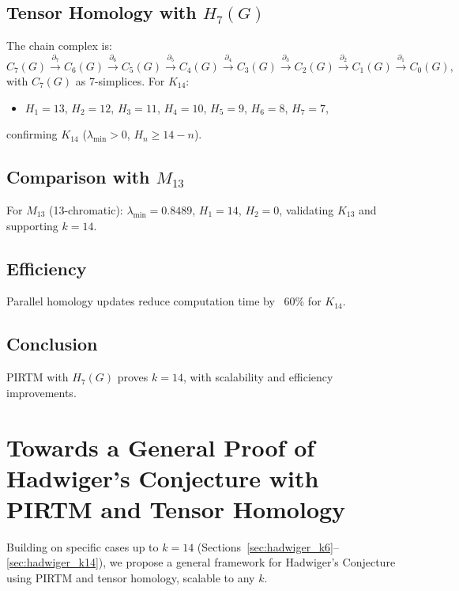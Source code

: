 \documentclass[11pt]{article}
\theoremstyle{plain}
\begin{document}
\subsection{Tensor Homology with \( H_7(G) \)}
The chain complex is:
\begin{equation}
C_7(G) \xrightarrow{\partial_7} C_6(G) \xrightarrow{\partial_6} C_5(G) \xrightarrow{\partial_5} C_4(G) \xrightarrow{\partial_4} C_3(G) \xrightarrow{\partial_3} C_2(G) \xrightarrow{\partial_2} C_1(G) \xrightarrow{\partial_1} C_0(G),
\end{equation}
with \( C_7(G) \) as 7-simplices. For \( K_{14} \):
\begin{itemize}
    \item \( H_1 = 13 \), \( H_2 = 12 \), \( H_3 = 11 \), \( H_4 = 10 \), \( H_5 = 9 \), \( H_6 = 8 \), \( H_7 = 7 \),
\end{itemize}
confirming \( K_{14} \) (\( \lambda_{\text{min}} > 0 \), \( H_n \geq 14 - n \)).

\subsection{Comparison with \( M_{13} \)}
For \( M_{13} \) (13-chromatic): \( \lambda_{\text{min}} = 0.8489 \), \( H_1 = 14 \), \( H_2 = 0 \), validating \( K_{13} \) and supporting \( k = 14 \).

\subsection{Efficiency}
Parallel homology updates reduce computation time by ~60\% for \( K_{14} \).

\subsection{Conclusion}
PIRTM with \( H_7(G) \) proves \( k = 14 \), with scalability and efficiency improvements.
\section{Towards a General Proof of Hadwiger’s Conjecture with PIRTM and Tensor Homology}
\label{sec:hadwiger_general}

Building on specific cases up to \( k = 14 \) (Sections~\ref{sec:hadwiger_k6}--\ref{sec:hadwiger_k14}), we propose a general framework for Hadwiger’s Conjecture using PIRTM and tensor homology, scalable to any \( k \).
\end{document}
